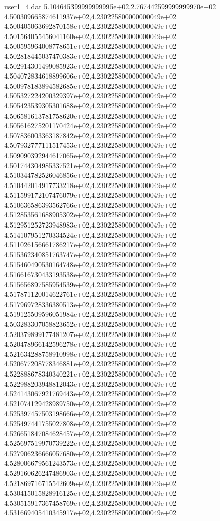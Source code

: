 \begin{filecontents}{user1_4.dat}
5.104645399999999995e+02,2.767442599999999970e+02
4.500309665874611937e+02,4.230225800000000049e+02
4.500405063692870158e+02,4.230225800000000049e+02
4.501564055456041160e+02,4.230225800000000049e+02
4.500595964008778651e+02,4.230225800000000049e+02
4.502818445037470383e+02,4.230225800000000049e+02
4.502914301499085923e+02,4.230225800000000049e+02
4.504072834618899606e+02,4.230225800000000049e+02
4.500978183894582685e+02,4.230225800000000049e+02
4.505327224200329397e+02,4.230225800000000049e+02
4.505423539305301688e+02,4.230225800000000049e+02
4.506581613781758620e+02,4.230225800000000049e+02
4.505616275201170424e+02,4.230225800000000049e+02
4.507836003363187842e+02,4.230225800000000049e+02
4.507932777111517453e+02,4.230225800000000049e+02
4.509090392944617065e+02,4.230225800000000049e+02
4.501744304985337521e+02,4.230225800000000049e+02
4.510344782526046856e+02,4.230225800000000049e+02
4.510442014917733218e+02,4.230225800000000049e+02
4.511599172107476079e+02,4.230225800000000049e+02
4.510636586393562766e+02,4.230225800000000049e+02
4.512853561688905302e+02,4.230225800000000049e+02
4.512951252723948983e+02,4.230225800000000049e+02
4.514107951270334524e+02,4.230225800000000049e+02
4.511026156661786217e+02,4.230225800000000049e+02
4.515362340851763747e+02,4.230225800000000049e+02
4.515460490530164748e+02,4.230225800000000049e+02
4.516616730433193538e+02,4.230225800000000049e+02
4.515656897585954539e+02,4.230225800000000049e+02
4.517871120014622761e+02,4.230225800000000049e+02
4.517969728336380513e+02,4.230225800000000049e+02
4.519125509596051984e+02,4.230225800000000049e+02
4.503283307058823652e+02,4.230225800000000049e+02
4.520379899177481207e+02,4.230225800000000049e+02
4.520478966142596278e+02,4.230225800000000049e+02
4.521634288758910998e+02,4.230225800000000049e+02
4.520677208778346881e+02,4.230225800000000049e+02
4.522888678340340221e+02,4.230225800000000049e+02
4.522988203948812043e+02,4.230225800000000049e+02
4.524143067921769443e+02,4.230225800000000049e+02
4.521074129428989750e+02,4.230225800000000049e+02
4.525397457503198666e+02,4.230225800000000049e+02
4.525497441755027808e+02,4.230225800000000049e+02
4.526651847084628457e+02,4.230225800000000049e+02
4.525697519970739222e+02,4.230225800000000049e+02
4.527906236666057680e+02,4.230225800000000049e+02
4.528006679561243573e+02,4.230225800000000049e+02
4.529160626247486903e+02,4.230225800000000049e+02
4.521869716715542609e+02,4.230225800000000049e+02
4.530415015828916125e+02,4.230225800000000049e+02
4.530515917367458769e+02,4.230225800000000049e+02
4.531669405410345917e+02,4.230225800000000049e+02

\end{filecontents}
